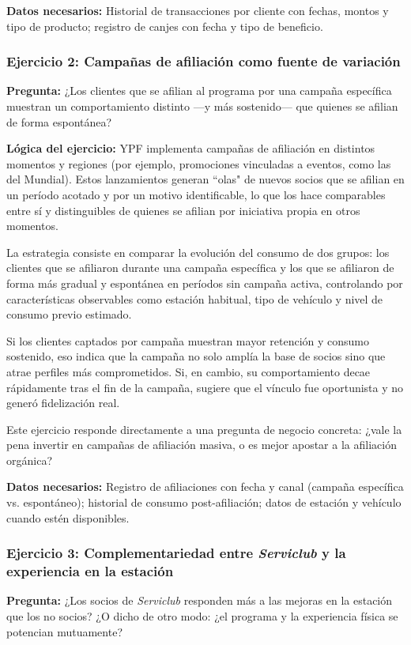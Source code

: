 \textbf{Datos necesarios:} Historial de transacciones por cliente con fechas, montos y tipo de producto; registro de canjes con fecha y tipo de beneficio.

\subsubsection*{Ejercicio 2: Campañas de afiliación como fuente de variación}
\textbf{Pregunta:} ¿Los clientes que se afilian al programa por una campaña específica muestran un comportamiento distinto —y más sostenido— que quienes se afilian de forma espontánea?

\textbf{Lógica del ejercicio:} YPF implementa campañas de afiliación en distintos momentos y regiones (por ejemplo, promociones vinculadas a eventos, como las del Mundial). Estos lanzamientos generan ``olas" de nuevos socios que se afilian en un período acotado y por un motivo identificable, lo que los hace comparables entre sí y distinguibles de quienes se afilian por iniciativa propia en otros momentos.

La estrategia consiste en comparar la evolución del consumo de dos grupos: los clientes que se afiliaron durante una campaña específica y los que se afiliaron de forma más gradual y espontánea en períodos sin campaña activa, controlando por características observables como estación habitual, tipo de vehículo y nivel de consumo previo estimado.

Si los clientes captados por campaña muestran mayor retención y consumo sostenido, eso indica que la campaña no solo amplía la base de socios sino que atrae perfiles más comprometidos. Si, en cambio, su comportamiento decae rápidamente tras el fin de la campaña, sugiere que el vínculo fue oportunista y no generó fidelización real.

Este ejercicio responde directamente a una pregunta de negocio concreta: ¿vale la pena invertir en campañas de afiliación masiva, o es mejor apostar a la afiliación orgánica?

\textbf{Datos necesarios:} Registro de afiliaciones con fecha y canal (campaña específica vs. espontáneo); historial de consumo post-afiliación; datos de estación y vehículo cuando estén disponibles.


\subsubsection*{Ejercicio 3: Complementariedad entre \emph{Serviclub} y la experiencia en la estación}
\textbf{Pregunta:} ¿Los socios de \emph{Serviclub} responden más a las mejoras en la estación que los no socios? ¿O dicho de otro modo: ¿el programa y la experiencia física se potencian mutuamente?

